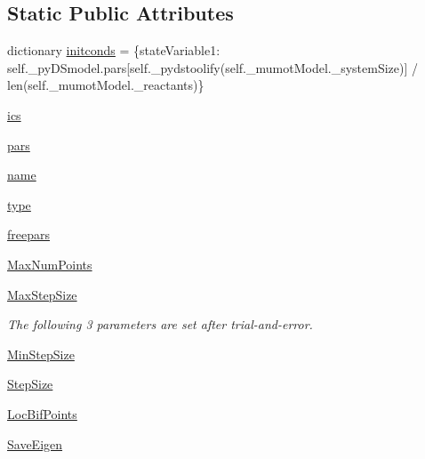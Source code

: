\subsection*{Static Public Attributes}
\begin{DoxyCompactItemize}
\item 
dictionary \hyperlink{class_mu_mo_t_1_1_mu_mo_t_1_1_mu_mo_tbifurcation_view_a23ca095d6146b220be161f1f73017674}{initconds} = \{state\+Variable1\+: self.\+\_\+py\+D\+Smodel.\+pars\mbox{[}self.\+\_\+pydstoolify(self.\+\_\+mumot\+Model.\+\_\+system\+Size)\mbox{]} / len(self.\+\_\+mumot\+Model.\+\_\+reactants)\}
\item 
\hyperlink{class_mu_mo_t_1_1_mu_mo_t_1_1_mu_mo_tbifurcation_view_a08c7b0edb053705a8c47fe487b6f53bd}{ics}
\item 
\hyperlink{class_mu_mo_t_1_1_mu_mo_t_1_1_mu_mo_tbifurcation_view_a372cc7d4f485e77e35668d40b507d0e5}{pars}
\item 
\hyperlink{class_mu_mo_t_1_1_mu_mo_t_1_1_mu_mo_tbifurcation_view_ab74e6bf80237ddc4109968cedc58c151}{name}
\item 
\hyperlink{class_mu_mo_t_1_1_mu_mo_t_1_1_mu_mo_tbifurcation_view_a7aead736a07eaf25623ad7bfa1f0ee2d}{type}
\item 
\hyperlink{class_mu_mo_t_1_1_mu_mo_t_1_1_mu_mo_tbifurcation_view_a15cf90b3888db001a8299a477d50af98}{freepars}
\item 
\hyperlink{class_mu_mo_t_1_1_mu_mo_t_1_1_mu_mo_tbifurcation_view_aaa677c130e36435865b68ff6230a932d}{Max\+Num\+Points}
\item 
\hyperlink{class_mu_mo_t_1_1_mu_mo_t_1_1_mu_mo_tbifurcation_view_a0a7557ffe670b6a318afa8bd9851d2fc}{Max\+Step\+Size}
\begin{DoxyCompactList}\small\item\em The following 3 parameters are set after trial-\/and-\/error. \end{DoxyCompactList}\item 
\hyperlink{class_mu_mo_t_1_1_mu_mo_t_1_1_mu_mo_tbifurcation_view_a5fe506ca005e76a55ccd505a36e17fe6}{Min\+Step\+Size}
\item 
\hyperlink{class_mu_mo_t_1_1_mu_mo_t_1_1_mu_mo_tbifurcation_view_a9c25479455e9bdd389f37c4bccfefea1}{Step\+Size}
\item 
\hyperlink{class_mu_mo_t_1_1_mu_mo_t_1_1_mu_mo_tbifurcation_view_a7ff5325c1fceeebd63c3e4805a2206c8}{Loc\+Bif\+Points}
\item 
\hyperlink{class_mu_mo_t_1_1_mu_mo_t_1_1_mu_mo_tbifurcation_view_a040a7ecbcbaca807aeaec6d5c81801d5}{Save\+Eigen}

\end{DoxyCompactItemize}
